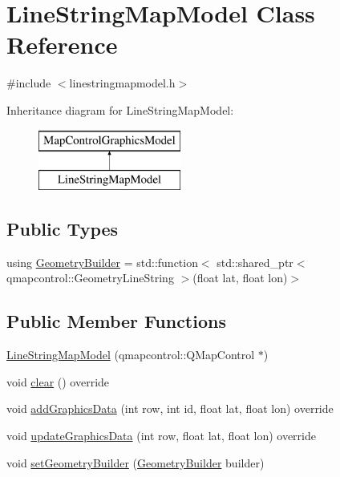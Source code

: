 \hypertarget{class_line_string_map_model}{}\section{Line\+String\+Map\+Model Class Reference}
\label{class_line_string_map_model}


{\ttfamily \#include $<$linestringmapmodel.\+h$>$}

Inheritance diagram for Line\+String\+Map\+Model\+:\begin{figure}[H]
\begin{center}
\leavevmode
\includegraphics[height=2.000000cm]{d6/df9/class_line_string_map_model}
\end{center}
\end{figure}
\subsection*{Public Types}
\begin{DoxyCompactItemize}
\item 
using \mbox{\hyperlink{class_line_string_map_model_aca5f8e0c93dad8e39f8ec3aed0eee6a0}{Geometry\+Builder}} = std\+::function$<$ std\+::shared\+\_\+ptr$<$ qmapcontrol\+::\+Geometry\+Line\+String $>$(float lat, float lon)$>$
\end{DoxyCompactItemize}
\subsection*{Public Member Functions}
\begin{DoxyCompactItemize}
\item 
\mbox{\hyperlink{class_line_string_map_model_a47f6a85ae566bef4971dd6da4ce9cc43}{Line\+String\+Map\+Model}} (qmapcontrol\+::\+Q\+Map\+Control $\ast$)
\item 
void \mbox{\hyperlink{class_line_string_map_model_a55ac4e44332434feaa70f15edfd1f925}{clear}} () override
\item 
void \mbox{\hyperlink{class_line_string_map_model_ac4dae650b1e13b3517f134de4b90a3cf}{add\+Graphics\+Data}} (int row, int id, float lat, float lon) override
\item 
void \mbox{\hyperlink{class_line_string_map_model_acdc4df56b2414a10f00f2f01b8418ea0}{update\+Graphics\+Data}} (int row, float lat, float lon) override
\item 
void \mbox{\hyperlink{class_line_string_map_model_a91414d80085600c4e89dbac25cb30d8e}{set\+Geometry\+Builder}} (\mbox{\hyperlink{class_line_string_map_model_aca5f8e0c93dad8e39f8ec3aed0eee6a0}{Geometry\+Builder}} builder)
\end{DoxyCompactItemize}


